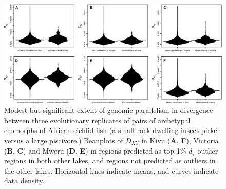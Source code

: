 \begin{figure}
\centering
\includegraphics[width=\textwidth]{uLakes/figures/fig4}
\caption{Modest but significant extent of genomic parallelism in divergence between three evolutionary replicates of pairs of archetypal ecomorphs of African cichlid fish (a small rock-dwelling insect picker versus a large piscivore.) Beanplots of $D_{XY}$ in Kivu (\textbf{A}, \textbf{F}), Victoria (\textbf{B}, \textbf{C}) and Mweru (\textbf{D}, \textbf{E}) in regions predicted as top 1\% $d_f$ outlier regions in both other lakes, and regions not predicted as outliers in the other lakes. Horizontal lines indicate means, and curves indicate data density.}
\label{UL_fig4}
\end{figure}